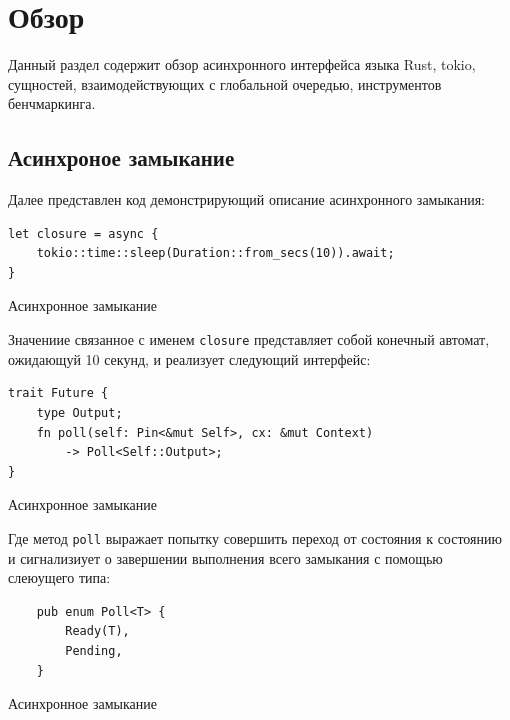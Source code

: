
\section{Обзор}

Данный раздел содержит обзор асинхронного интерфейса языка Rust, tokio, сущностей, взаимодействующих с глобальной очередью, инструментов бенчмаркинга.

\subsection{Асинхроное замыкание}

Далее представлен код демонстрирующий описание асинхронного замыкания:

\begin{listing}[H]
    \begin{verbatim}
let closure = async {
    tokio::time::sleep(Duration::from_secs(10)).await;
}
    \end{verbatim}

    \caption{Асинхронное замыкание}
    \label{listing:async_closure}
\end{listing}

Значениие связанное с именем \verb|closure| представляет собой конечный автомат, ожидающуй 10 секунд, и реализует следующий интерфейс:

\begin{listing}[H]
    \begin{verbatim}
trait Future {
    type Output;
    fn poll(self: Pin<&mut Self>, cx: &mut Context)
        -> Poll<Self::Output>;
}
    \end{verbatim}

    \caption{Асинхронное замыкание}
    \label{listing:future_trait}
\end{listing}

Где метод \verb|poll| выражает попытку совершить переход от состояния к состоянию и сигнализиует о завершении выполнения всего замыкания с помощью слеюущего типа:

\begin{listing}[H]
    \begin{verbatim}
    pub enum Poll<T> {
        Ready(T),
        Pending,
    }
    \end{verbatim}

    \caption{Асинхронное замыкание}
    \label{listing:future:poll}
\end{listing}

